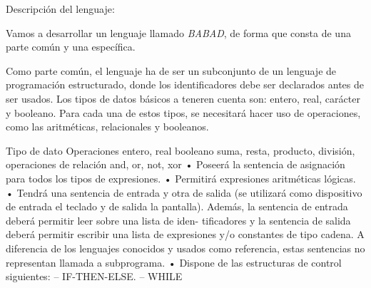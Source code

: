 Descripción del lenguaje:

Vamos a desarrollar un lenguaje llamado \textit{BABAD}, de forma que consta de una parte común y una específica.

Como parte común, el lenguaje ha de ser un subconjunto de un lenguaje de programación estructurado, donde los identificadores debe ser declarados antes de ser usados. Los tipos de datos básicos a teneren cuenta son: entero, real, carácter y booleano. Para cada una de estos tipos, se necesitará hacer uso de operaciones, como las aritméticas, relacionales y booleanos.

Tipo de dato Operaciones
entero, real
booleano suma, resta, producto, división, operaciones de relación
and, or, not, xor
• Poseerá la sentencia de asignación para todos los tipos de expresiones.
• Permitirá expresiones aritméticas lógicas.
• Tendrá una sentencia de entrada y otra de salida (se utilizará como dispositivo de entrada el teclado
y de salida la pantalla). Además, la sentencia de entrada deberá permitir leer sobre una lista de iden-
tificadores y la sentencia de salida deberá permitir escribir una lista de expresiones y/o constantes
de tipo cadena. A diferencia de los lenguajes conocidos y usados como referencia, estas sentencias
no representan llamada a subprograma.
• Dispone de las estructuras de control siguientes:
– IF-THEN-ELSE.
– WHILE